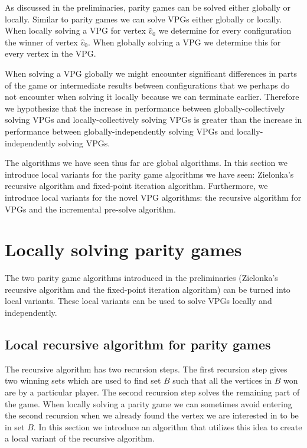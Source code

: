 As discussed in the preliminaries, parity games can be solved either globally or locally. Similar to parity games we can solve VPGs either globally or locally. When locally solving a VPG for vertex $\hat{v}_0$ we determine for every configuration the winner of vertex $\hat{v}_0$. When globally solving a VPG we determine this for every vertex in the VPG.

When solving a VPG globally we might encounter significant differences in parts of the game or intermediate results between configurations that we perhaps do not encounter when solving it locally because we can terminate earlier. Therefore we hypothesize that the increase in performance between globally-collectively solving VPGs and locally-collectively solving VPGs is greater than the increase in performance between globally-independently solving VPGs and locally-independently solving VPGs.

The algorithms we have seen thus far are global algorithms. In this section we introduce local variants for the parity game algorithms we have seen: Zielonka's recursive algorithm and fixed-point iteration algorithm. Furthermore, we introduce local variants for the novel VPG algorithms: the recursive algorithm for VPGs and the incremental pre-solve algorithm.

\section{Locally solving parity games}
The two parity game algorithms introduced in the preliminaries (Zielonka's recursive algorithm and the fixed-point iteration algorithm) can be turned into local variants. These local variants can be used to solve VPGs locally and independently.

\subsection{Local recursive algorithm for parity games}
\label{sec:zlnk_org_local}
The recursive algorithm has two recursion steps. The first recursion step gives two winning sets which are used to find set $B$ such that all the vertices in $B$ won are by a particular player. The second recursion step solves the remaining part of the game. When locally solving a parity game we can sometimes avoid entering the second recursion when we already found the vertex we are interested in to be in set $B$. In this section we introduce an algorithm that utilizes this idea to create a local variant of the recursive algorithm.

